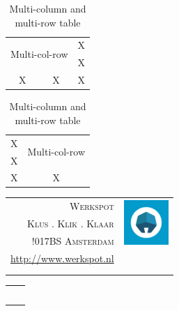 \documentclass[11pt]{article}
\begin{document}
 
\begin{table}[ht]
\caption{Multi-column and multi-row table}
\begin{center}
\begin{tabular}{ccc}
    \hline
    \multicolumn{2}{c}{\multirow{2}{*}{Multi-col-row}}&X\\
    \multicolumn{2}{c}{}&X\\
    \hline
    X&X&X\\
    \hline
\end{tabular}
\end{center}
\label{tab:multicol}
\end{table}

\begin{table}[ht]
\caption{Multi-column and multi-row table}
\begin{center}
\begin{tabular}{c|c}
    \hline
    X & \multirow{2}{*}{Multi-col-row} \\
    X & \\
    \hline
    X&X\\
    \hline
\end{tabular}
\end{center}
\label{tab:multicol}
\end{table}
 
 
  \begin{tabular}{r|l}
    \textsc{\Large Werkspot} & \multirow{3}{*}{\includegraphics[height=48pt,width=48pt]{../img/werkspot.pdf}}\\
	\textsc{Klus . Klik . Klaar} & \\
	\textsc{!017BS Amsterdam} & \\
	\url{http://www.werkspot.nl} \\
	\multicolumn{2}{c}{} \\
	\multicolumn{2}{c}{}
  \end{tabular}
  
  \begin{table}[h]
\begin{tabular}{ll}
\multicolumn{1}{l|}{} & \multirow{3}{*}{} \\
\multicolumn{1}{l|}{} &                   \\
\multicolumn{1}{l|}{} &                   \\
                      &                   \\
\multicolumn{1}{l|}{} &                  
\end{tabular}
\end{table}
\end{document}

